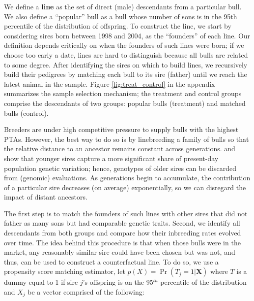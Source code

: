 \documentclass[12pt,letterpaper]{article}
\begin{document}
We define a \textbf{line} as the set of direct (male) descendants from a particular bull. 
We also define a ``popular'' bull as a bull whose number of sons is in the 95th percentile of the distribution of offspring. 
To construct the line, we start by considering sires born between 1998 and 2004, as the ``founders'' of each line. Our definition depends critically on when the founders of such lines were born; if we choose too early a date, lines are hard to distinguish because all bulls are related to some degree. 
After identifying the sires on which to build lines, we recursively build their pedigrees by matching each bull to its sire (father) until we reach the latest animal in the sample. 
Figure \ref{fig:treat_control} in the appendix summarizes the sample selection mechanism; the treatment and control groups comprise the descendants of two groups: popular bulls (treatment) and matched bulls (control).

Breeders are under high competitive pressure to supply bulls with the highest PTAs. However, the best way to do so is by linebreeding a family of bulls so that the relative distance to an ancestor remains constant across generations. \cite{Steyn2022} and \cite{Steyn2023} show that younger sires capture a more significant share of present-day population genetic variation; hence, genotypes of older sires can be discarded from (genomic) evaluations. As generations begin to accumulate, the contribution of a particular sire decreases (on average) exponentially, so we can disregard the impact of distant ancestors. 



The first step is to match the founders of such lines with other sires that did not father as many sons but had comparable genetic traits. Second, we identify all descendants from both groups and compare how their inbreeding rates evolved over time. The idea behind this procedure is that when those bulls were in the market, any reasonably similar sire could have been chosen but was not, and thus, can be used to construct a counterfactual line. To do so, we use a propensity score matching estimator, let $p(X)=\Pr(T_{j} = 1 | \mathbf{X})$ where $T$ is a dummy equal to 1 if sire $j$'s offspring is on the 95$^{th}$ percentile of the distribution and $X_{j}$ be a vector comprised of the following:
\end{document}

